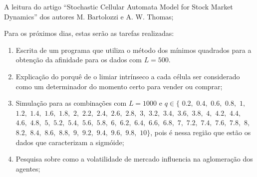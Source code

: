 \documentclass[12pt,a4paper,final]{article}
\begin{document}
  A leitura do artigo ``Stochastic Cellular Automata Model for Stock Market Dynamics'' dos autores M. Bartolozzi e A. W. Thomas;

  Para os próximos dias, estas serão as tarefas realizadas:
  \begin{enumerate}
    \item Escrita de um programa que utiliza o método dos mínimos quadrados para a obtenção da afinidade para os dados com $L=500$.
    \item Explicação do porquê de o limiar intrínseco a cada célula ser considerado como um determinador do momento certo para vender ou comprar;
    \item Simulação para as combinações com $L = 1000$ e $q\in\{$ 
    $0.2,$ $0.4,$ $0.6,$ $0.8,$ $1,$ 
    $1.2,$ $1.4,$ $1.6,$ $1.8,$ $2,$ 
    $2.2,$ $2.4,$ $2.6,$ $2.8,$ $3,$
    $3.2,$ $3.4,$ $3.6,$ $3.8,$ $4,$
    $4.2,$ $4.4,$ $4.6,$ $4.8,$ $5,$
    $5.2,$ $5.4,$ $5.6,$ $5.8,$ $6,$
    $6.2,$ $6.4,$ $6.6,$ $6.8,$ $7,$ 
    $7.2,$ $7.4,$ $7.6,$ $7.8,$ $8,$
    $8.2,$ $8.4,$ $8.6,$ $8.8,$ $9,$ 
    $9.2,$ $9.4,$ $9.6,$ $9.8,$ $10\}$, pois é nessa região que estão os dados que caracterizam a sigmóide;
		\item Pesquisa sobre como a volatilidade de mercado influencia na aglomeração dos agentes;
	\end{enumerate}
\end{document}
